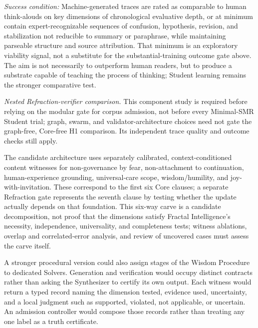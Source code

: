 \documentclass[11pt]{article}
\begin{document}
\emph{Success condition:} Machine-generated traces are rated as comparable
to human think-alouds on key dimensions of chronological evaluative depth, or
at minimum contain expert-recognizable sequences of confusion, hypothesis,
revision, and stabilization not reducible to summary or paraphrase, while
maintaining parseable structure and source attribution. That minimum is an
exploratory viability signal, not a substitute for the substantial-training
outcome gate above.
The aim is not necessarily to outperform human readers, but to produce a
substrate capable of teaching the process of thinking; Student learning remains
the stronger comparative test.

\label{sec:refraction-verifier-test}
\emph{Nested Refraction-verifier comparison.}
This component study is required
before relying on the modular gate for corpus admission, not before every
Minimal-SMR Student trial; graph, swarm, and validator-architecture choices
need not gate the graph-free, Core-free H1 comparison. Its independent trace
quality and outcome checks still apply.

The candidate architecture uses separately calibrated, context-conditioned
content witnesses for non-governance by fear, non-attachment to continuation,
human-experience grounding, universal-care scope, wisdom/humility, and
joy-with-invitation. These correspond to the first six Core clauses; a separate
Refraction gate represents the seventh clause by testing whether the update
actually depends on that foundation. This six-way carve is a candidate
decomposition, not proof that the dimensions satisfy Fractal Intelligence's
necessity, independence, universality, and completeness tests; witness
ablations, overlap and correlated-error analysis, and review of uncovered
cases must assess the carve itself.

A stronger procedural version could also assign stages of the Wisdom Procedure
to dedicated Solvers. Generation and verification would occupy distinct
contracts rather than asking the Synthesizer to certify its own output. Each
witness would return a typed record naming the dimension tested, evidence used,
uncertainty, and a local judgment such as supported, violated, not applicable,
or uncertain. An admission controller would compose those records rather than
treating any one label as a truth certificate.
\end{document}
